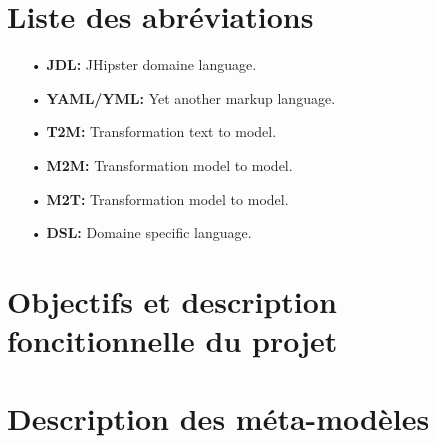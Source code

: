 \documentclass[]{report}
\author{Kotbi Abderrahmane, El Hafi Abdessamad}
\date{Februray 15th, 2022}
\begin{document}
\begin{doublespace}



\newpage

\setcounter{page}{1}

\tableofcontents

\newpage

\listoffigures
{}

\newpage

\chapter*{\centering Liste des abréviations}
\begin{itemize}
    \item[•] \textbf{JDL:} JHipster domaine language.
    \item[•] \textbf{YAML/YML:} Yet another markup language.
    \item[•] \textbf{T2M:} Transformation text to model.
    \item[•] \textbf{M2M:} Transformation model to model.
    \item[•] \textbf{M2T:} Transformation model to model.
    \item[•] \textbf{DSL:} Domaine specific language.
\end{itemize}

\newpage

\setcounter{page}{1}

\chapter{Objectifs et description foncitionnelle du projet}
\fancyhead[R]{\hspace*{5cm}}
	

\chapter{Description des méta-modèles}
\fancyhead[R]{\hspace*{5cm}}
	


\end{doublespace}
\end{document}
